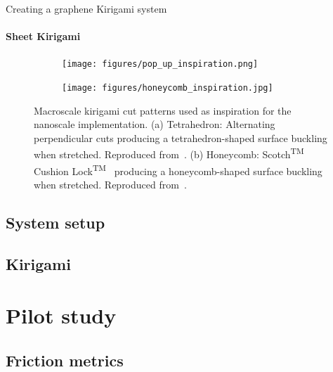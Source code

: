 \documentclass[
	10pt, %
]{beamer}
\begin{document}
\begin{frame}{Creating a graphene Kirigami system}
	\framesubtitle{Sheet Kirigami}

	\begin{figure}[!htb]
		\centering
		\begin{subfigure}[t]{0.48\textwidth}
			\centering
			\texttt{[image: figures/pop\_up\_inspiration.png]}
			\caption{}
		\end{subfigure}
		\hfill
		\begin{subfigure}[t]{0.48\textwidth}
			\centering
			\texttt{[image: figures/honeycomb\_inspiration.jpg]}
			\caption{}
		\end{subfigure}
		\hfill
		   \caption{Macroscale kirigami cut patterns used as inspiration for the nanoscale implementation. (a) Tetrahedron: Alternating perpendicular cuts producing a tetrahedron-shaped surface buckling when stretched. Reproduced from~\cite{new_pop_up}. (b) Honeycomb: Scotch\textsuperscript{TM} Cushion Lock\textsuperscript{TM}~\cite{cushion_wrap} producing a honeycomb-shaped surface buckling when stretched. Reproduced from~\cite{cushion_wrap}.}
	  \end{figure}
	  


		
\end{frame}
	






\subsection{System setup}
\subsection{Kirigami}




\section{Pilot study} %
\subsection{Friction metrics}
\end{document}
